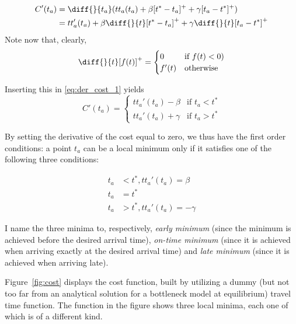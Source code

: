 \begin{equation}
  \label{eq:der_cost_1}
  \begin{split}
    C'(t_a) & = \diff{}{t_a}(tt_a(t_a) + \beta [t^* - t_a]^+ + \gamma [t_a - t^*]^+) \\
            & = tt_a'(t_a) + \beta \diff{}{t}[t^* - t_a]^+ + \gamma \diff{}{t} [t_a - t^*]^+
  \end{split}
\end{equation}
Note now that, clearly,
\begin{equation*}
  \diff{}{t}[f(t)]^+ =
  \begin{cases}
    0 & \text{if } f(t) < 0) \\
    f'(t) & \text{otherwise}
  \end{cases}
\end{equation*}

Inserting this in \eqref{eq:der_cost_1} yields
\begin{equation}
  \label{eq:der_cost_2}
  C'(t_a) =
  \begin{cases}
    tt_a'(t_a) - \beta & \text{if } t_a < t^* \\
    tt_a'(t_a) + \gamma & \text{if } t_a > t^*
  \end{cases}
\end{equation}

By setting the derivative of the cost equal to zero,
we thus have the first order conditions:
a point \(t_a\) can be a local minimum only if it satisfies one of the following three conditions:

\begin{equation}
  \label{eq:three_minima}
  \begin{split}
    t_a & < t^*, tt_a'(t_a) = \beta \\
    t_a & = t^* \\
    t_a & > t^*, tt_a'(t_a) = -\gamma
  \end{split}
\end{equation}

I name the three minima to, respectively,
\textit{early minimum} (since the minimum is achieved before the desired arrival time),
\textit{on-time minimum} (since it is achieved when arriving exactly at the desired arrival time)
and \textit{late minimum} (since it is achieved when arriving late).

Figure~\ref{fig:cost} displays the cost function, built by utilizing a dummy
(but not too far from an analytical solution for a bottleneck model at equilibrium)
travel time function.
The function in the figure shows three local minima, each one of which is of a different kind.

